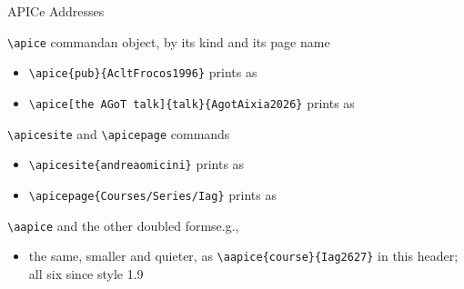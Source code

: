 \documentclass[presentation,cesena,apice]{beamer}\mode<presentation>{\usetheme{AMSBolognaFC}}
\begin{document}
\begin{frame}[c,fragile]{APICe Addresses}
%
\begin{block}{\texttt{\textbackslash{}apice} command\textemdash{}an object, by its kind and its page name}
\begin{itemize}
	\item[e.g.] \verb|| prints as \apice{pub}{AcltFrocos1996}
	\item[e.g.] \verb|| prints as \apice[the AGoT talk]{talk}{AgotAixia2026}
\end{itemize}
\end{block}
%
\begin{block}{\texttt{\textbackslash{}apicesite} and \texttt{\textbackslash{}apicepage} commands}
\begin{itemize}
	\item[e.g.] \verb|| prints as \apicesite{andreaomicini}
	\item[e.g.] \verb|| prints as \apicepage{Courses/Series/Iag}
\end{itemize}
\end{block}
%
\begin{block}{\texttt{\textbackslash{}aapice} and the other doubled forms\textemdash{}e.g., }
\begin{itemize}
	\item the same, smaller and quieter, as \verb|\aapice{course}{Iag2627}| in this header; all six since style 1.9
\end{itemize}
\end{block}
%
\end{frame}
\end{document}
